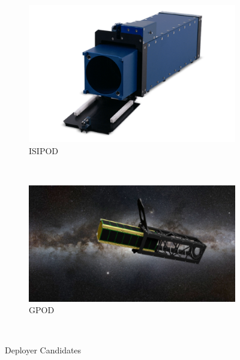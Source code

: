 \begin{figure}
    \centering
    \begin{subfigure}[b]{0.6\textwidth}
        \includegraphics[width=\textwidth]{./Sections_CD/S3-Deployer/Images_S3/Picture_1_S3.png}
        \caption{ISIPOD}
        \label{fig:gull}
    \end{subfigure}
    ~ %
    \begin{subfigure}[b]{0.6\textwidth}
        \includegraphics[width=\textwidth]{./Sections_CD/S3-Deployer/Images_S3/Picture_2_S3.png}
        \caption{GPOD}
        \label{fig:tiger}
    \end{subfigure}
    ~ %
    \caption{Deployer Candidates}\label{fig:animals}
\end{figure}
